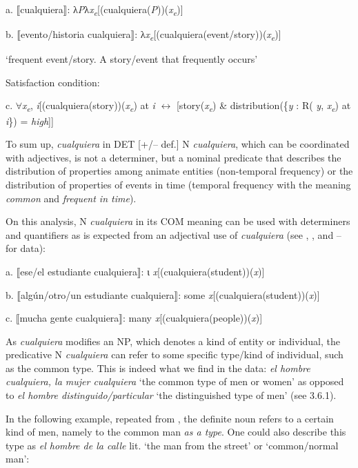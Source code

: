 \documentclass[output=paper]{langscibook}
\begin{document}
  a.  ⟦cualquiera⟧: λ\textit{P}λ\textit{x\textsubscript{e}}[(cualquiera(\textit{P}))(\textit{x\textsubscript{e}})]

  b.  ⟦evento/historia cualquiera⟧: λ\textit{x\textsubscript{e}}[(cualquiera(event/story))(\textit{x\textsubscript{e}})]

    ‘frequent event/story. A story/event that frequently occurs’

  Satisfaction condition:

  c.  ${\forall}$\textit{x\textsubscript{e}}, \textit{i}[(cualquiera(story))(\textit{x\textsubscript{e}}) at \textit{i} $\leftrightarrow $ [story(\textit{x\textsubscript{e}}) \& distribution(\{\textit{y} : R( \textit{y}, \textit{x\textsubscript{e}}) at \textit{i}\}) = \textit{high}]]

To sum up, \textit{cualquiera} in DET [+/– def.] N \textit{cualquiera}, which can be coordinated with adjectives, is not a determiner, but a nominal predicate that describes the distribution of properties among animate entities (non-temporal frequency) or the distribution of properties of events in time (temporal frequency with the meaning \textit{common} and \textit{frequent in time}).

On this analysis, N \textit{cualquiera} in its COM meaning can be used with determiners and quantifiers as is expected from an adjectival use of \textit{cualquiera} (see , , and –  for data):

  a.  ⟦ese/el estudiante cualquiera⟧: ι \textit{x}[(cualquiera(student))(\textit{x})]

  b.  ⟦algún/otro/un estudiante cualquiera⟧: some \textit{x}[(cualquiera(student))(\textit{x})]

  c.  ⟦mucha gente cualquiera⟧: many \textit{x}[(cualquiera(people))(\textit{x})]

As \textit{cualquiera} modifies an NP, which denotes a kind of entity or individual, the predicative N \textit{cualquiera} can refer to some specific type/kind of individual, such as the common type. This is indeed what we find in the data: \textit{el hombre cualquiera, la mujer cualquiera} ‘the common type of men or women’ as opposed to \textit{el hombre distinguido/particular} ‘the distinguished type of men’ (see 3.6.1).

  In the following example, repeated from , the definite noun refers to a certain kind of men, namely to the common man \textit{as a type}. One could also describe this type as \textit{el hombre de la calle} lit. ‘the man from the street’ or ‘common/normal man’:
\end{document}
